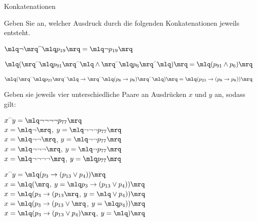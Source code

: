 \documentclass[a4paper,12pt]{scrartcl}
\begin{document}
\begin{task}{Konkatenationen}
\begin{subtasks}
	\item Geben Sie an, welcher Ausdruck durch die folgenden Konkatenationen jeweils entsteht. \\
	\begin{subtasks}
		\item $\mq{\neg} \concat \mq{p_{19}} = \mq{\neg p_{19}}$ 
		\item $\mq{(} \concat \mq{p_{91}} \concat \mq{\land} \concat \mq{p_6} \concat \mq{)}  = \mq{(p_{91} \land p_6)}$
		\item $\mq{(} \concat \mq{p_{23}} \concat \mq{\then} \concat \mq{(p_8 \then p_8)} \concat \mq{)}  = \mq{(p_{23} \then (p_8 \then p_8))}$ \\
	\end{subtasks} 
	\item Geben sie jeweils vier unterschiedliche Paare an Ausdrücken $x$ und $y$ an, sodass gilt: \\
	\begin{subtasks}
	\item $x \concat y = \mq{\neg \neg \neg \neg p_{77}}$\\
	$x=\mq{\neg}$, $y=\mq{\neg \neg \neg p_{77}}$\\
	$x=\mq{\neg \neg}$, $y=\mq{\neg \neg p_{77}}$\\
	$x=\mq{\neg \neg \neg}$, $y=\mq{\neg p_{77}}$\\
	$x=\mq{\neg \neg \neg \neg }$, $y=\mq{p_{77}}$\\
	\item $x \concat y = \mq{(p_3 \then (p_{13} \lor p_4))}$\\
	$x=\mq{(}$, $y=\mq{p_3 \then (p_{13} \lor p_4))}$\\
	$x=\mq{(p_3 \then (p_{13}}$, $y=\mq{ \lor p_4))}$\\
	$x=\mq{(p_3 \then (p_{13} \lor }$, $y=\mq{p_4))}$\\
	$x=\mq{(p_3 \then (p_{13} \lor p_4)}$, $y=\mq{)}$\\
	\end{subtasks}
\end{subtasks}
\end{task}
\end{document}

